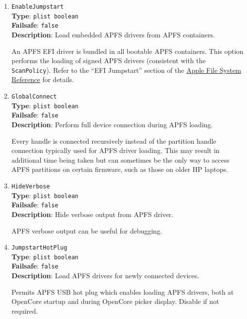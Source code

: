 \documentclass[]{article}
\begin{document}
\begin{enumerate}

\item
  \texttt{EnableJumpstart}\\
  \textbf{Type}: \texttt{plist\ boolean}\\
  \textbf{Failsafe}: \texttt{false}\\
  \textbf{Description}: Load embedded APFS drivers from APFS containers.

  An APFS EFI driver is bundled in all bootable APFS containers. This
  option performs the loading of signed APFS drivers (consistent with the
  \texttt{ScanPolicy}). Refer to the ``EFI Jumpstart'' section of the
  \href{https://developer.apple.com/support/apple-file-system/Apple-File-System-Reference.pdf}{Apple File System Reference} for details.


\item
  \texttt{GlobalConnect}\\
  \textbf{Type}: \texttt{plist\ boolean}\\
  \textbf{Failsafe}: \texttt{false}\\
  \textbf{Description}: Perform full device connection during APFS loading.

  Every handle is connected recursively instead of the partition handle connection
  typically used for APFS driver loading. This may result in additional time being
  taken but can sometimes be the only way to access APFS partitions on certain
  firmware, such as those on older HP laptops.

\item
  \texttt{HideVerbose}\\
  \textbf{Type}: \texttt{plist\ boolean}\\
  \textbf{Failsafe}: \texttt{false}\\
  \textbf{Description}: Hide verbose output from APFS driver.

  APFS verbose output can be useful for debugging.

\item
  \texttt{JumpstartHotPlug}\\
  \textbf{Type}: \texttt{plist\ boolean}\\
  \textbf{Failsafe}: \texttt{false}\\
  \textbf{Description}: Load APFS drivers for newly connected devices.

  Permits APFS USB hot plug which enables loading APFS drivers, both at OpenCore
  startup and during OpenCore picker display. Disable if not required.


\end{enumerate}
\end{document}
